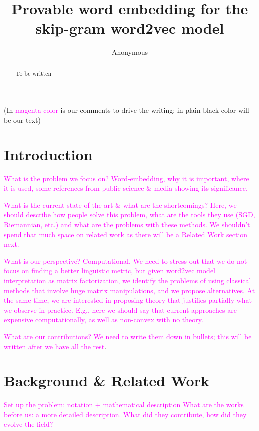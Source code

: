 \documentclass[letterpaper]{article} %
\begin{document}
%

\title{Provable word embedding for the skip-gram word2vec model}

\author{Anonymous}

\maketitle

\begin{abstract}
To be written
\end{abstract}

(In \textcolor{magenta}{magenta color} is our comments to drive the writing; in plain black color will be our text)

\section{Introduction}
\textcolor{magenta}{What is the problem we focus on? Word-embedding, why it is important, where it is used, some references from public science \& media showing its significance.}

\textcolor{magenta}{What is the current state of the art \& what are the shortcomings? Here, we should describe how people solve this problem, what are the tools they use (SGD, Riemannian, etc.) and what are the problems with these methods. We shouldn't spend that much space on related work as there will be a Related Work section next.}

\textcolor{magenta}{What is our perspective? Computational. We need to stress out that we do not focus on finding a better linguistic metric, but given word2vec model interpretation as matrix factorization, we identify the problems of using classical methods that involve huge matrix manipulations, and we propose alternatives. At the same time, we are interested in proposing theory that justifies partially what we observe in practice. E.g., here we should say that current approaches are expensive computationally, as well as non-convex with no theory.}

\textcolor{magenta}{What are our contributions? We need to write them down in bullets; this will be written after we have all the rest}.

\section{Background \& Related Work}
\textcolor{magenta}{Set up the problem: notation + mathematical description}
\textcolor{magenta}{What are the works before us: a more detailed description. What did they contribute, how did they evolve the field?}
\end{document}
